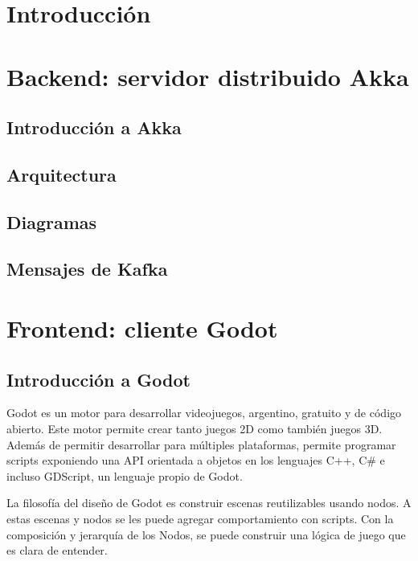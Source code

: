 \documentclass[12pt]{article}
\begin{document}


\newpage

\section{Introducción}



\section{Backend: servidor distribuido Akka}

\subsection{Introducción a Akka}

\subsection{Arquitectura}

\subsection{Diagramas}

\subsection{Mensajes de Kafka}


\section{Frontend: cliente Godot}

\subsection{Introducción a Godot}

Godot es un motor para desarrollar videojuegos, argentino, gratuito y de código abierto. Este motor permite crear tanto juegos 2D como también juegos 3D. Además de permitir desarrollar para múltiples plataformas, permite programar scripts exponiendo una API orientada a objetos en los lenguajes C++, C\# e incluso GDScript, un lenguaje propio de Godot.

La filosofía del diseño de Godot es construir escenas reutilizables usando nodos. A estas escenas y nodos se les puede agregar comportamiento con scripts. Con la composición y jerarquía de los Nodos, se puede construir una lógica de juego que es clara de entender.
\end{document}

